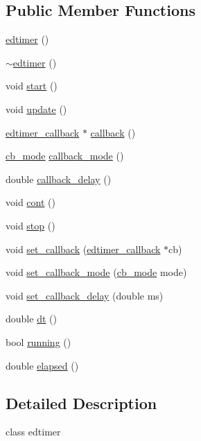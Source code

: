 \subsection*{Public Member Functions}
\begin{DoxyCompactItemize}
\item 
\hyperlink{classedtimer_af3afa47f363c1e707703ad10c4fc2829}{edtimer} ()
\item 
\hyperlink{classedtimer_aa0dd7c212ac5a84387d19aef703aa444}{$\sim$edtimer} ()
\item 
void \hyperlink{classedtimer_aca8d2329a885239a766ac05fb8be0e9e}{start} ()
\item 
void \hyperlink{classedtimer_a03ef77e7fa8f3a78103911a57e7a853b}{update} ()
\item 
\hyperlink{structedtimer__callback}{edtimer\-\_\-callback} $\ast$ \hyperlink{classedtimer_a47940c8f28c543ab714e2f8e2fcfb891}{callback} ()
\item 
\hyperlink{classedtimer_adf4b2a0dcb914d94b59f8dd4a0ae4f09}{cb\-\_\-mode} \hyperlink{classedtimer_ac17a1a5a49cea8d1bf1d651507f6fa80}{callback\-\_\-mode} ()
\item 
double \hyperlink{classedtimer_a5f624b575aca211c1eae1269803e925e}{callback\-\_\-delay} ()
\item 
void \hyperlink{classedtimer_afe07b61f497a6f29eab5ac9e501b030c}{cont} ()
\item 
void \hyperlink{classedtimer_aa4f6c4cd295e52ec0ed21a4a9040c02b}{stop} ()
\item 
void \hyperlink{classedtimer_aeb2c60b9e85b4566cc05523427218267}{set\-\_\-callback} (\hyperlink{structedtimer__callback}{edtimer\-\_\-callback} $\ast$cb)
\item 
void \hyperlink{classedtimer_a83f11a6711feb8d0c9896acffeba348b}{set\-\_\-callback\-\_\-mode} (\hyperlink{classedtimer_adf4b2a0dcb914d94b59f8dd4a0ae4f09}{cb\-\_\-mode} mode)
\item 
void \hyperlink{classedtimer_a01833c50e6c87aae1dd5b5bd002f4dd4}{set\-\_\-callback\-\_\-delay} (double ms)
\item 
double \hyperlink{classedtimer_a85b9765fd91c0000da27073676547646}{dt} ()
\item 
bool \hyperlink{classedtimer_afa251e84882c066b2335be2f45339bcf}{running} ()
\item 
double \hyperlink{classedtimer_adabe667da00fa3dbf0ca25c16c83333e}{elapsed} ()
\end{DoxyCompactItemize}


\subsection{Detailed Description}
class edtimer 

